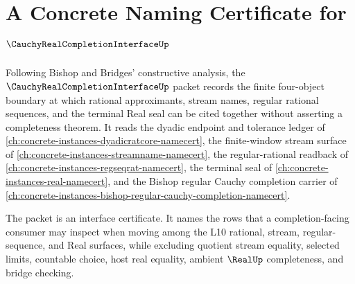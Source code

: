 \chapter{A Concrete Naming Certificate for $\CauchyRealCompletionInterfaceUp$}
\label{ch:concrete-instances-cauchy-real-completion-interface-namecert}

Following Bishop and Bridges' constructive analysis, the $\CauchyRealCompletionInterfaceUp$ packet records the finite four-object boundary at which rational approximants, stream names, regular rational sequences, and the terminal Real seal can be cited together without asserting a completeness theorem. It reads the dyadic endpoint and tolerance ledger of \autoref{ch:concrete-instances-dyadicratcore-namecert}, the finite-window stream surface of \autoref{ch:concrete-instances-streamname-namecert}, the regular-rational readback of \autoref{ch:concrete-instances-regseqrat-namecert}, the terminal seal of \autoref{ch:concrete-instances-real-namecert}, and the Bishop regular Cauchy completion carrier of \autoref{ch:concrete-instances-bishop-regular-cauchy-completion-namecert}.

The packet is an interface certificate. It names the rows that a completion-facing consumer may inspect when moving among the L10 rational, stream, regular-sequence, and Real surfaces, while excluding quotient stream equality, selected limits, countable choice, host real equality, ambient $\RealUp$ completeness, and bridge checking.

